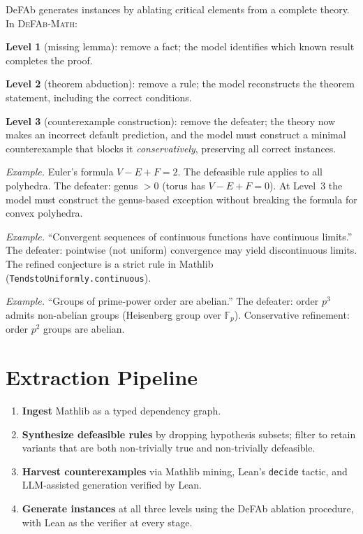 \documentclass[11pt]{article}
\begin{document}
DeFAb generates instances by ablating critical elements from a complete
theory. In \textsc{DeFAb-Math}:

\smallskip
\noindent\textbf{Level 1} (missing lemma): remove a fact; the model
identifies which known result completes the proof.

\noindent\textbf{Level 2} (theorem abduction): remove a rule; the model
reconstructs the theorem statement, including the correct conditions.

\noindent\textbf{Level 3} (counterexample construction): remove the
defeater; the theory now makes an incorrect default prediction, and the
model must construct a minimal counterexample that blocks it
\emph{conservatively}, preserving all correct instances.

\smallskip
\noindent\textit{Example.} Euler's formula $V{-}E{+}F=2$. The
defeasible rule applies to all polyhedra. The defeater: genus $> 0$
(torus has $V{-}E{+}F=0$). At Level~3 the model must construct the
genus-based exception without breaking the formula for convex polyhedra.

\noindent\textit{Example.} ``Convergent sequences of continuous
functions have continuous limits.'' The defeater: pointwise (not
uniform) convergence may yield discontinuous limits. The refined
conjecture is a strict rule in Mathlib
(\texttt{TendstoUniformly.continuous}).

\noindent\textit{Example.} ``Groups of prime-power order are abelian.''
The defeater: order $p^3$ admits non-abelian groups (Heisenberg group
over $\mathbb{F}_p$). Conservative refinement: order $p^2$ groups are
abelian.

\section*{Extraction Pipeline}

\begin{enumerate}[nosep]
\item \textbf{Ingest} Mathlib as a typed dependency graph.
\item \textbf{Synthesize defeasible rules} by dropping hypothesis
  subsets; filter to retain variants that are both non-trivially true
  and non-trivially defeasible.
\item \textbf{Harvest counterexamples} via Mathlib mining, Lean's
  \texttt{decide} tactic, and LLM-assisted generation verified by Lean.
\item \textbf{Generate instances} at all three levels using the DeFAb
  ablation procedure, with Lean as the verifier at every stage.
\end{enumerate}
\end{document}
